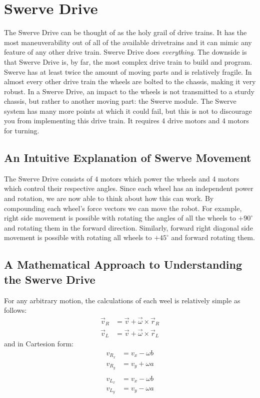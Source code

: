 \documentclass[a4paper]{article}
\begin{document}
\section{Swerve Drive}
The Swerve Drive can be thought of as the holy grail of drive trains. It has the most maneuverability out of all of the available drivetrains and it can mimic any feature of any other drive train. Swerve Drive does \textit{everything}. The downside is that Swerve Drive is, by far, the most complex drive train to build and program. Swerve has at least twice the amount of moving parts and is relatively fragile. In almost every other drive train the wheels are bolted to the chassis, making it very robust. In a Swerve Drive, an impact to the wheels is not transmitted to a sturdy chassis, but rather to another moving part: the Swerve module. The Swerve system has many more points at which it could fail, but this is not to discourage you from implementing this drive train. It requires 4 drive motors and 4 motors for turning. 

\subsection{An Intuitive Explanation of Swerve Movement}
The Swerve Drive consists of $4$ motors which power the wheels and 4 motors which control their respective angles. Since each wheel has an independent power and rotation, we are now able to think about how this can work. By compounding each wheel's force vectors we can move the robot. For example, right side movement is possible with rotating the angles of all the wheels to $+90^\circ$ and rotating them in the forward direction. Similarly, forward right diagonal side movement is possible with rotating all wheels to $+45^\circ$ and forward rotating them. 

\subsection{A Mathematical Approach to Understanding the Swerve Drive}
For any arbitrary motion, the calculations of each weel is relatively simple as follows: 
\begin{align*}	\vec v_R &= \vec v +\vec \omega\times\vec r_R \\
								\vec v_L &= \vec v +\vec \omega\times\vec r_L \end{align*}
and in Cartesion form:
\begin{align*} 	v_{R_x}	&=v_x-\omega b \\ 
								v_{R_y} &=v_y+\omega a \\
								&\\
								v_{L_x}	&=v_x-\omega b \\
								v_{L_y}	&=v_y-\omega a	\end{align*}
								
\end{document}
